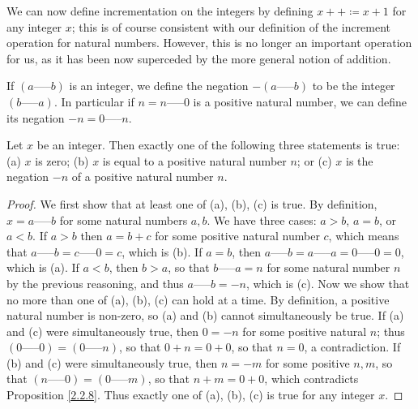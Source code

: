 We can now define incrementation on the integers by defining \(x++ \coloneqq x + 1\) for any integer \(x\);
this is of course consistent with our definition of the increment operation for natural numbers.
However, this is no longer an important operation for us, as it has been now superceded by the more general notion of addition.

\begin{definition}\label{4.1.4}
If \((a \text{-----} b)\) is an integer, we define the negation \(-(a \text{-----} b)\) to be the integer \((b \text{-----} a)\).
In particular if \(n = n \text{-----} 0\) is a positive natural number, we can define its negation \(-n = 0 \text{-----} n\).
\end{definition}

\begin{lemma}\label{4.1.5}
Let \(x\) be an integer.
Then exactly one of the following three statements is true:
(a) \(x\) is zero;
(b) \(x\) is equal to a positive natural number \(n\);
or (c) \(x\) is the negation \(-n\) of a positive natural number \(n\).
\end{lemma}

\begin{proof}
We first show that at least one of (a), (b), (c) is true.
By definition, \(x = a \text{-----} b\) for some natural numbers \(a, b\).
We have three cases: \(a > b\), \(a = b\), or \(a < b\).
If \(a > b\) then \(a = b + c \) for some positive natural number \(c\), which means that \(a \text{-----} b = c \text{-----} 0 = c\), which is (b).
If \(a = b\), then \(a \text{-----} b = a \text{-----} a = 0 \text{-----} 0 = 0\), which is (a).
If \(a < b\), then \(b > a\), so that \(b \text{-----} a = n\) for some natural number \(n\) by the previous reasoning, and thus \(a \text{-----} b = -n\), which is (c).
Now we show that no more than one of (a), (b), (c) can hold at a time.
By definition, a positive natural number is non-zero, so (a) and (b) cannot simultaneously be true.
If (a) and (c) were simultaneously true, then \(0 = -n\) for some positive natural \(n\);
thus \((0 \text{-----} 0) = (0 \text{-----} n)\), so that \(0 + n = 0 + 0\), so that \(n = 0\), a contradiction.
If (b) and (c) were simultaneously true, then \(n = -m\) for some positive \(n, m\), so that \((n \text{-----} 0) = (0 \text{-----} m)\), so that \(n + m = 0 + 0\), which contradicts Proposition \ref{2.2.8}.
Thus exactly one of (a), (b), (c) is true for any integer \(x\).
\end{proof}


